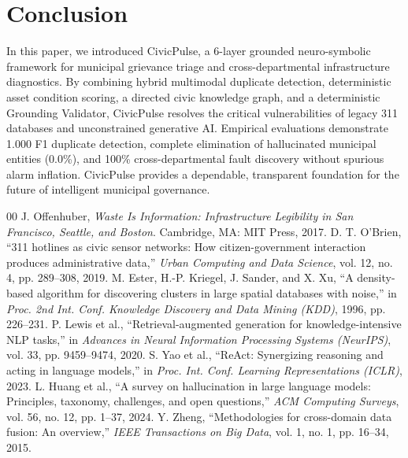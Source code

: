 \documentclass[conference]{IEEEtran}
\begin{document}
\section{Conclusion}
In this paper, we introduced CivicPulse, a 6-layer grounded neuro-symbolic framework for municipal grievance triage and cross-departmental infrastructure diagnostics. By combining hybrid multimodal duplicate detection, deterministic asset condition scoring, a directed civic knowledge graph, and a deterministic Grounding Validator, CivicPulse resolves the critical vulnerabilities of legacy 311 databases and unconstrained generative AI. Empirical evaluations demonstrate 1.000 F1 duplicate detection, complete elimination of hallucinated municipal entities (0.0\%), and 100\% cross-departmental fault discovery without spurious alarm inflation. CivicPulse provides a dependable, transparent foundation for the future of intelligent municipal governance.

\begin{thebibliography}{00}
 J. Offenhuber, \textit{Waste Is Information: Infrastructure Legibility in San Francisco, Seattle, and Boston}. Cambridge, MA: MIT Press, 2017.
 D. T. O'Brien, ``311 hotlines as civic sensor networks: How citizen-government interaction produces administrative data,'' \textit{Urban Computing and Data Science}, vol. 12, no. 4, pp. 289--308, 2019.
 M. Ester, H.-P. Kriegel, J. Sander, and X. Xu, ``A density-based algorithm for discovering clusters in large spatial databases with noise,'' in \textit{Proc. 2nd Int. Conf. Knowledge Discovery and Data Mining (KDD)}, 1996, pp. 226--231.
 P. Lewis et al., ``Retrieval-augmented generation for knowledge-intensive NLP tasks,'' in \textit{Advances in Neural Information Processing Systems (NeurIPS)}, vol. 33, pp. 9459--9474, 2020.
 S. Yao et al., ``ReAct: Synergizing reasoning and acting in language models,'' in \textit{Proc. Int. Conf. Learning Representations (ICLR)}, 2023.
 L. Huang et al., ``A survey on hallucination in large language models: Principles, taxonomy, challenges, and open questions,'' \textit{ACM Computing Surveys}, vol. 56, no. 12, pp. 1--37, 2024.
 Y. Zheng, ``Methodologies for cross-domain data fusion: An overview,'' \textit{IEEE Transactions on Big Data}, vol. 1, no. 1, pp. 16--34, 2015.
\end{thebibliography}
\end{document}
